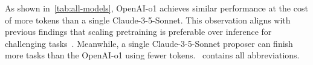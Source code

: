 
As shown in~\cref{tab:all-models}, OpenAI-o1 achieves similar performance at the cost of more tokens than a single Claude-3-5-Sonnet. This observation aligns with previous findings that scaling pretraining is preferable over inference for challenging tasks~\cite{snell2024scaling}. Meanwhile, a single Claude-3-5-Sonnet proposer can finish more tasks than the OpenAI-o1 using fewer tokens.~ contains all abbreviations.

